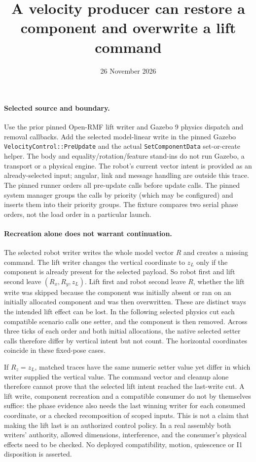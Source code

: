 \documentclass[11pt]{article}
\title{A velocity producer can restore a component and overwrite a lift command}
\date{26 November 2026}
\begin{document}
\maketitle
\paragraph{Selected source and boundary.}
Use the prior pinned Open-RMF lift writer and Gazebo 9 physics
dispatch and removal callbacks. Add the selected model-linear
write in the pinned Gazebo \texttt{VelocityControl::PreUpdate}
and the actual \texttt{SetComponentData} set-or-create helper.
The body and equality/rotation/feature stand-ins do not run
Gazebo, a transport or a physical engine. The robot's current
vector intent is provided as an already-selected input; angular,
link and message handling are outside this trace. The pinned runner
orders all pre-update calls before update calls. The pinned system
manager groups the calls by priority (which may be configured) and
inserts them into their priority groups. The fixture compares two
serial phase orders, not the load order in a particular launch.

\paragraph{Recreation alone does not warrant continuation.}
The selected robot writer writes the whole model vector $R$ and
creates a missing command. The lift writer changes the vertical
coordinate to $z_L$ only if the component is already present for
the selected payload. So robot first and lift second leave
$(R_x,R_y,z_L)$. Lift first and robot second leave $R$, whether the
lift write was skipped because the component was initially absent
or ran on an initially allocated component and was then overwritten.
These are distinct ways the intended lift effect can be lost.
In the following selected physics cut each compatible scenario calls
one setter, and the component is then removed. Across three ticks
of each order and both initial allocations, the native selected
setter calls therefore differ by vertical intent but not count.
The horizontal coordinates coincide in these fixed-pose cases.

If $R_z=z_L$, matched traces have the same numeric setter value yet
differ in which writer supplied the vertical value. The command
vector and cleanup alone therefore cannot prove that the selected
lift intent reached the last-write cut. A lift write, component
recreation and a compatible consumer do not by themselves suffice:
the phase evidence also needs the last winning writer for each
consumed coordinate, or a checked recomposition of scoped inputs.
This is not a claim that making the lift last is an authorized
control policy. In a real assembly both writers' authority,
allowed dimensions, interference, and the consumer's physical
effects need to be checked. No deployed compatibility, motion,
quiescence or I1 disposition is asserted.
\end{document}
